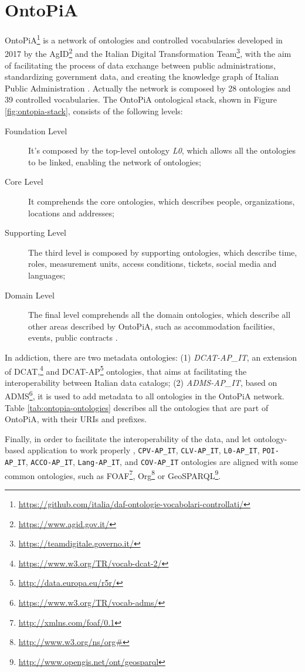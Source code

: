 \section{OntoPiA}
\label{sec:ontopia}

OntoPiA\footnote{\url{https://github.com/italia/daf-ontologie-vocabolari-controllati/}} is a network of ontologies and controlled vocabularies developed in 2017 by the \ac{AgID}\footnote{\url{https://www.agid.gov.it/}} and the Italian Digital Transformation Team\footnote{\url{https://teamdigitale.governo.it/}}, with the aim of facilitating the process of data exchange between public administrations, standardizing government data, and creating the knowledge graph of Italian Public Administration \cite{agid2017pt, agid2017lg}. Actually the network is composed by 28 ontologies and 39 controlled vocabularies. The OntoPiA ontological stack, shown in Figure \ref{fig:ontopia-stack}, consists of the following levels:

\begin{description}
  \item[Foundation Level] It's composed by the top-level ontology \textit{L0}, which allows all the ontologies to be linked, enabling the network of ontologies;
  \item[Core Level] It comprehends the core ontologies, which describes people, organizations, locations and addresses;
  \item[Supporting Level] The third level is composed by supporting ontologies, which describe time, roles, measurement units, access conditions, tickets, social media and languages;
  \item[Domain Level] The final level comprehends all the domain ontologies, which describe all other areas described by OntoPiA, such as accommodation facilities, events, public contracts \etc.
\end{description}

In addiction, there are two metadata ontologies: (1) \textit{DCAT-AP\_IT}, an extension of DCAT,\footnote{\url{https://www.w3.org/TR/vocab-dcat-2/}} and DCAT-AP\footnote{\url{http://data.europa.eu/r5r/}} ontologies, that aims at facilitating the interoperability between Italian data catalogs; (2) \textit{ADMS-AP\_IT}, based on ADMS\footnote{\url{https://www.w3.org/TR/vocab-adms/}}, it is used to add metadata to all ontologies in the OntoPiA network. Table \ref{tab:ontopia-ontologies} describes all the ontologies that are part of OntoPiA, with their \acp{URI} and prefixes.

Finally, in order to facilitate the interoperability of the data, and let ontology-based application to work properly \cite{euzenat2008ontology}, \verb#CPV-AP_IT#, \verb#CLV-AP_IT#, \verb#L0-AP_IT#, \verb#POI-AP_IT#, \verb#ACCO-AP_IT#, \verb#Lang-AP_IT#, and \verb#COV-AP_IT# ontologies are aligned with some common ontologies, such as FOAF\footnote{\url{http://xmlns.com/foaf/0.1}}, Org\footnote{\url{http://www.w3.org/ns/org\#}} or GeoSPARQL\footnote{\url{http://www.opengis.net/ont/geosparql}}.

